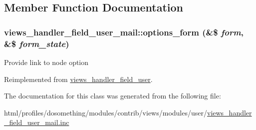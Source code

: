\subsection{Member Function Documentation}
\hypertarget{classviews__handler__field__user__mail_aee55735f96178173853dbf1f8b293216}{
\subsubsection[{options\_\-form}]{\setlength{\rightskip}{0pt plus 5cm}views\_\-handler\_\-field\_\-user\_\-mail::options\_\-form (\&\$ {\em form}, \/  \&\$ {\em form\_\-state})}}
\label{classviews__handler__field__user__mail_aee55735f96178173853dbf1f8b293216}
Provide link to node option 

Reimplemented from \hyperlink{classviews__handler__field__user_aecf77682fa7dc9daf1fa97cbe045420d}{views\_\-handler\_\-field\_\-user}.

The documentation for this class was generated from the following file:\begin{DoxyCompactItemize}
\item 
html/profiles/dosomething/modules/contrib/views/modules/user/\hyperlink{views__handler__field__user__mail_8inc}{views\_\-handler\_\-field\_\-user\_\-mail.inc}\end{DoxyCompactItemize}
